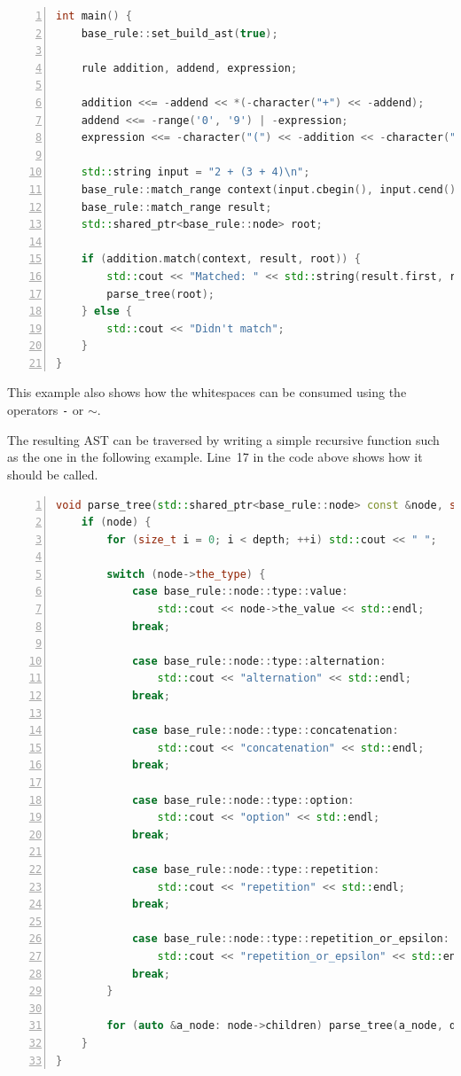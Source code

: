 \documentclass[12pt]{article}
\begin{document}
\begin{center}
	\begin{minipage}[h]{0.85\textwidth}
		\begin{lstlisting}[language=C++, breaklines=true, numbers=left]
int main() {
	base_rule::set_build_ast(true);

	rule addition, addend, expression;

	addition <<= -addend << *(-character("+") << -addend);
	addend <<= -range('0', '9') | -expression;
	expression <<= -character("(") << -addition << -character(")");

	std::string input = "2 + (3 + 4)\n";
	base_rule::match_range context(input.cbegin(), input.cend());
	base_rule::match_range result;
	std::shared_ptr<base_rule::node> root;

	if (addition.match(context, result, root)) {
		std::cout << "Matched: " << std::string(result.first, result.second);
		parse_tree(root);
	} else {
		std::cout << "Didn't match";
	}
}
		\end{lstlisting}
	\end{minipage}
\end{center}

This example also shows how the whitespaces can be consumed using the operators \texttt{-} or \texttt{$\sim$}.

The resulting AST can be traversed by writing a simple recursive function such as the one in the following
example. Line~17 in the code above shows how it should be called.

\begin{center}
	\begin{minipage}[h]{0.95\textwidth}
		\begin{lstlisting}[language=C++, breaklines=true, numbers=left]
void parse_tree(std::shared_ptr<base_rule::node> const &node, size_t depth=0) {
	if (node) {
		for (size_t i = 0; i < depth; ++i) std::cout << " ";

		switch (node->the_type) {
			case base_rule::node::type::value:
				std::cout << node->the_value << std::endl;
			break;

			case base_rule::node::type::alternation:
				std::cout << "alternation" << std::endl;
			break;

			case base_rule::node::type::concatenation:
				std::cout << "concatenation" << std::endl;
			break;

			case base_rule::node::type::option:
				std::cout << "option" << std::endl;
			break;

			case base_rule::node::type::repetition:
				std::cout << "repetition" << std::endl;
			break;

			case base_rule::node::type::repetition_or_epsilon:
				std::cout << "repetition_or_epsilon" << std::endl;
			break;
		}

		for (auto &a_node: node->children) parse_tree(a_node, depth + 1);
	}
}
		\end{lstlisting}
	\end{minipage}
\end{center}
\end{document}
